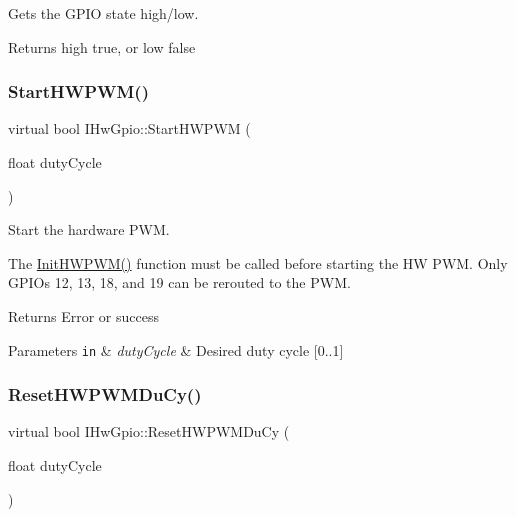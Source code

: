 Gets the G\+P\+IO state high/low. 

\begin{DoxyReturn}{Returns}
high true, or low false 
\end{DoxyReturn}
\mbox{\label{classIHwGpio_a5a6ed0cb7598db00ffd428d4bbf106c0}} 
\subsubsection{\texorpdfstring{Start\+H\+W\+P\+W\+M()}{StartHWPWM()}}
{\footnotesize\ttfamily virtual bool I\+Hw\+Gpio\+::\+Start\+H\+W\+P\+WM (\begin{DoxyParamCaption}\item[{float}]{duty\+Cycle }\end{DoxyParamCaption})\hspace{0.3cm}{\ttfamily [pure virtual]}}



Start the hardware P\+WM. 

The \hyperlink{classIHwGpio_ae383c9085032483c3e7edd50ae6b3989}{Init\+H\+W\+P\+W\+M()} function must be called before starting the HW P\+WM. Only G\+P\+I\+Os 12, 13, 18, and 19 can be rerouted to the P\+WM. \begin{DoxyReturn}{Returns}
Error or success 
\end{DoxyReturn}

\begin{DoxyParams}[1]{Parameters}
\mbox{\tt in}  & {\em duty\+Cycle} & Desired duty cycle \mbox{[}0..1\mbox{]} \\
\hline
\end{DoxyParams}
\mbox{\label{classIHwGpio_a6d1faea477f22aebe70853f66d772bbe}} 
\subsubsection{\texorpdfstring{Reset\+H\+W\+P\+W\+M\+Du\+Cy()}{ResetHWPWMDuCy()}}
{\footnotesize\ttfamily virtual bool I\+Hw\+Gpio\+::\+Reset\+H\+W\+P\+W\+M\+Du\+Cy (\begin{DoxyParamCaption}\item[{float}]{duty\+Cycle }\end{DoxyParamCaption})\hspace{0.3cm}{\ttfamily [pure virtual]}}



